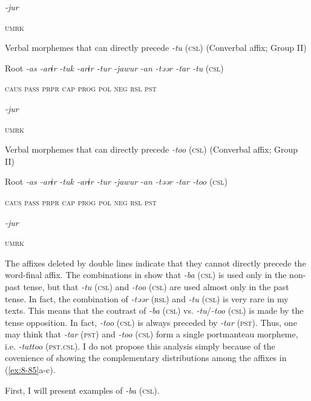           \textit{-jur}

          \textsc{umrk}


\ex Verbal morphemes that can directly precede \textit{-tu} (\textsc{csl}) (Converbal affix; Group II)

  Root  \textit{-as  -arɨr} %
\textit{-tuk  -arɨr  -tur  -jawur} %
\textit{-an  -təər  -tar  -tu} (\textsc{csl})

    \textsc{caus}  \textsc{pass}  \textsc{prpr}  \textsc{cap}  \textsc{prog}  \textsc{pol}  \textsc{neg}  \textsc{rsl}  \textsc{pst}

          \textit{-jur}

          \textsc{umrk}

\ex Verbal morphemes that can directly precede \textit{-too} (\textsc{csl}) (Converbal affix; Group II)

  Root  \textit{-as  -arɨr} %
\textit{-tuk  -arɨr  -tur  -jawur} %
\textit{-an  -təər  -tar  -too} (\textsc{csl})

    \textsc{caus}  \textsc{pass}  \textsc{prpr}  \textsc{cap}  \textsc{prog}  \textsc{pol}  \textsc{neg}  \textsc{rsl}  \textsc{pst}

          \textit{-jur}

          \textsc{umrk}
\z
\z

The affixes deleted by double lines indicate that they cannot directly precede the word-final affix. The combinations in  show that \textit{-ba} (\textsc{csl}) is used only in the non-past tense, but that \textit{-tu} (\textsc{csl}) and \textit{-too} (\textsc{csl}) are used almost only in the past tense. In fact, the combination of \textit{-təər} (\textsc{rsl}) and \textit{-tu} (\textsc{csl}) is very rare in my texts. This means that the contrast of \textit{-ba} (\textsc{csl}) vs. \textit{-tu}/\textit{-too} (\textsc{csl}) is made by the tense opposition. In fact, \textit{-too} (\textsc{csl}) is always preceded by \textit{-tar} (\textsc{pst}). Thus, one may think that \textit{-tar} (\textsc{pst}) and \textit{-too} (\textsc{csl}) form a single portmanteau morpheme, i.e. \textit{-tattoo} (\textsc{pst}.\textsc{csl}). I do not propose this analysis simply because of the covenience of showing the complementary distributions among the affixes in (\ref{ex:8-85}a-c).

  First, I will present examples of \textit{-ba} (\textsc{csl}).

